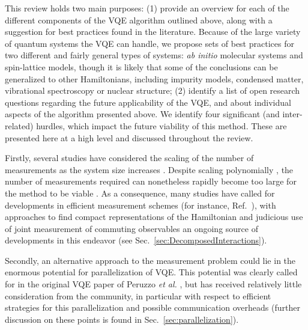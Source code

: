 This review holds two main purposes: (1) provide an overview for each of the different components of the VQE algorithm outlined above, along with a suggestion for best practices found in the literature. Because of the large variety of quantum systems the VQE can handle, we propose sets of best practices for two different and fairly general types of systems: \textit{ab initio} molecular systems and spin-lattice models, though it is likely that some of the conclusions can be generalized to other Hamiltonians, including impurity models, condensed matter, vibrational spectroscopy or nuclear structure; (2) identify a list of open research questions regarding the future applicability of the VQE, and about individual aspects of the algorithm presented above. We identify four significant (and inter-related) hurdles, which impact the future viability of this method. These are presented here at a high level and discussed throughout the review.

Firstly, several studies have considered the scaling of the number of measurements as the system size increases \cite{Wecker2015, Elfving2020, Kuhn2019, Gonthier2020}. Despite scaling polynomially \cite{mccleanTheoryVariationalHybrid2015}, the number of measurements required can nonetheless rapidly become too large for the method to be viable \cite{Wecker2015, Elfving2020, Gonthier2020}. As a consequence, many studies have called for developments in efficient measurement schemes (for instance, Ref.~\cite{Gonthier2020}), with approaches to find compact representations of the Hamiltonian and judicious use of joint measurement of commuting observables an ongoing source of developments in this endeavor (see Sec.~\ref{sec:DecomposedInteractions}). 

Secondly, an alternative approach to the measurement problem could lie in the enormous potential for parallelization of VQE. This potential was clearly called for in the original VQE paper of Peruzzo {\it et al.} \cite{Peruzzo2014}, but has received relatively little consideration from the community, in particular with respect to efficient strategies for this parallelization and possible communication overheads (further discussion on these points is found in Sec.~\ref{sec:parallelization}). 

